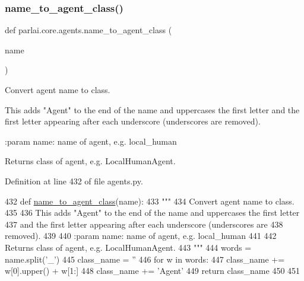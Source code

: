\subsubsection{\texorpdfstring{name\+\_\+to\+\_\+agent\+\_\+class()}{name\_to\_agent\_class()}}
{\footnotesize\ttfamily def parlai.\+core.\+agents.\+name\+\_\+to\+\_\+agent\+\_\+class (\begin{DoxyParamCaption}\item[{}]{name }\end{DoxyParamCaption})}

\begin{DoxyVerb}Convert agent name to class.

This adds "Agent" to the end of the name and uppercases the first letter
and the first letter appearing after each underscore (underscores are
removed).

:param name: name of agent, e.g. local_human

Returns class of agent, e.g. LocalHumanAgent.
\end{DoxyVerb}
 

Definition at line 432 of file agents.\+py.


\begin{DoxyCode}
432 \textcolor{keyword}{def }\hyperlink{namespaceparlai_1_1core_1_1agents_a7a5f5076b35ce376d8b46bfb362bfc53}{name\_to\_agent\_class}(name):
433     \textcolor{stringliteral}{"""}
434 \textcolor{stringliteral}{    Convert agent name to class.}
435 \textcolor{stringliteral}{}
436 \textcolor{stringliteral}{    This adds "Agent" to the end of the name and uppercases the first letter}
437 \textcolor{stringliteral}{    and the first letter appearing after each underscore (underscores are}
438 \textcolor{stringliteral}{    removed).}
439 \textcolor{stringliteral}{}
440 \textcolor{stringliteral}{    :param name: name of agent, e.g. local\_human}
441 \textcolor{stringliteral}{}
442 \textcolor{stringliteral}{    Returns class of agent, e.g. LocalHumanAgent.}
443 \textcolor{stringliteral}{    """}
444     words = name.split(\textcolor{stringliteral}{'\_'})
445     class\_name = \textcolor{stringliteral}{''}
446     \textcolor{keywordflow}{for} w \textcolor{keywordflow}{in} words:
447         class\_name += w[0].upper() + w[1:]
448     class\_name += \textcolor{stringliteral}{'Agent'}
449     \textcolor{keywordflow}{return} class\_name
450 
451 
\end{DoxyCode}
